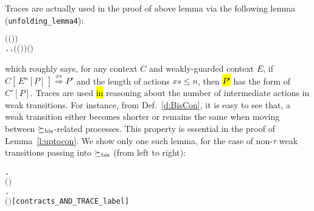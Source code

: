Traces are actually used in the proof of above lemma via 
the following lemma (\texttt{unfolding_lemma4}):
\begin{alltt}
\HOLTokenTurnstile{}   \HOLSymConst{\HOLTokenConj{}}   \HOLSymConst{\HOLTokenConj{}}  \ensuremath{(}\ensuremath{(} \HOLSymConst{\HOLTokenCompose}   \ensuremath{)} \ensuremath{)}   \HOLSymConst{\HOLTokenConj{}}   \HOLSymConst{\HOLTokenLeq{}}  \HOLSymConst{\HOLTokenImp{}}
   \HOLSymConst{\HOLTokenExists{}}.   \HOLSymConst{\HOLTokenConj{}}  \HOLSymConst{\ensuremath{=}}   \HOLSymConst{\HOLTokenConj{}} \HOLSymConst{\HOLTokenForall{}}.  \ensuremath{(}\ensuremath{(} \HOLSymConst{\HOLTokenCompose}   \ensuremath{)} \ensuremath{)}  \ensuremath{(} \ensuremath{)}
\end{alltt}
which roughly says, for any context $C$ and weakly-guarded context
$E$, if $C [\, E^n[P]\,] \overset{xs}{\Longrightarrow} P'$ and the length
of actions $xs \leqslant n$, then \hl{$P'$} has the form of $C'[P]$.
Traces are used \hl{in} reasoning about the number of intermediate actions in weak
transitions. For instance, from Def.~\ref{d:BisCon}, it is easy
to see that, a weak transition either becomes shorter
or remains the same when moving between $\mathrel{\succeq_{\rm{bis}}}$-related processes.
This property is essential in the proof of
Lemma~\ref{l:uptocon}. We show only one such lemma, for the case of
non-$\tau$ weak transitions passing into $\mathrel{\succeq_{\rm{bis}}}$ (from left to right):
\begin{alltt}
\HOLTokenTurnstile{}  \HOLSymConst{\HOLTokenContracts{}}  \HOLSymConst{\HOLTokenImp{}}
   \HOLSymConst{\HOLTokenForall{}}  .
           \HOLSymConst{\HOLTokenConj{}}  \ensuremath{(} \ensuremath{)}  \HOLSymConst{\HOLTokenImp{}}
       \HOLSymConst{\HOLTokenExists{}} .
               \HOLSymConst{\HOLTokenConj{}}  \HOLSymConst{\HOLTokenContracts{}}  \HOLSymConst{\HOLTokenConj{}}   \HOLSymConst{\HOLTokenLeq{}}   \HOLSymConst{\HOLTokenConj{}}
            \ensuremath{(} \ensuremath{)} \hfill{[contracts_AND_TRACE_label]}
\end{alltt}

